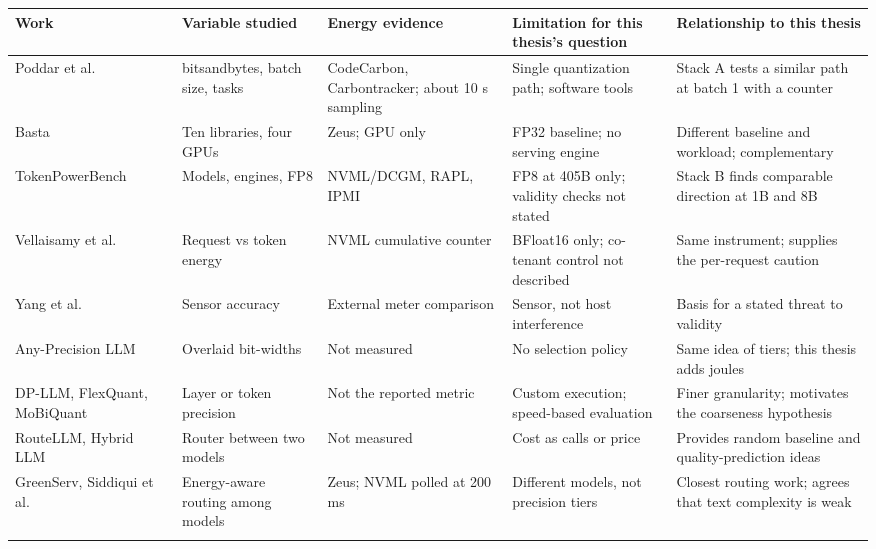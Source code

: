 \begingroup\footnotesize\setlength{\tabcolsep}{4pt}
\begin{longtable}{>{\raggedright\arraybackslash}p{30.1mm}>{\raggedright\arraybackslash}p{24.8mm}>{\raggedright\arraybackslash}p{26.5mm}>{\raggedright\arraybackslash}p{23.6mm}>{\raggedright\arraybackslash}p{31.0mm}}
\toprule
\textbf{Work} & \textbf{Variable studied} & \textbf{Energy evidence} & \textbf{Limitation for this thesis's question} & \textbf{Relationship to this thesis} \\
\midrule
\endhead
Poddar et al.~\cite{b6} & bitsandbytes, batch size, tasks & CodeCarbon, Carbontracker; about 10 s sampling & Single quantization path; software tools & Stack A tests a similar path at batch 1 with a counter \\*
Basta~\cite{b47} & Ten libraries, four GPUs & Zeus; GPU only & FP32 baseline; no serving engine & Different baseline and workload; complementary \\
TokenPowerBench~\cite{b7} & Models, engines, FP8 & NVML/DCGM, RAPL, IPMI & FP8 at 405B only; validity checks not stated & Stack B finds comparable direction at 1B and 8B \\
Vellaisamy et al.~\cite{b8} & Request vs token energy & NVML cumulative counter & BFloat16 only; co-tenant control not described & Same instrument; supplies the per-request caution \\
Yang et al.~\cite{b17} & Sensor accuracy & External meter comparison & Sensor, not host interference & Basis for a stated threat to validity \\
Any-Precision LLM~\cite{b25} & Overlaid bit-widths & Not measured & No selection policy & Same idea of tiers; this thesis adds joules \\
DP-LLM, FlexQuant, MoBiQuant~\cite{b50,b51,b52} & Layer or token precision & Not the reported metric & Custom execution; speed-based evaluation & Finer granularity; motivates the coarseness hypothesis \\*
RouteLLM, Hybrid LLM~\cite{b29,b30} & Router between two models & Not measured & Cost as calls or price & Provides random baseline and quality-prediction ideas \\*
GreenServ, Siddiqui et al.~\cite{b48,b49} & Energy-aware routing among models & Zeus; NVML polled at 200 ms & Different models, not precision tiers & Closest routing work; agrees that text complexity is weak \\*
\bottomrule\noalign{\nobreak}
\end{longtable}
\addtocounter{table}{-1}
\endgroup

